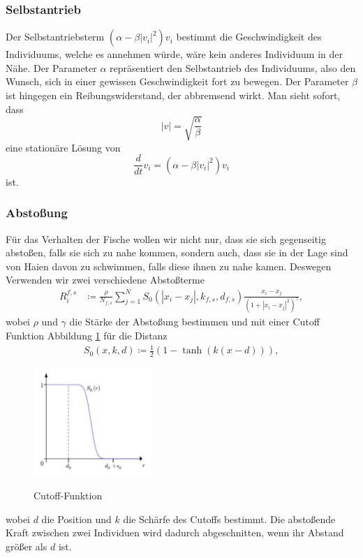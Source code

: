 \documentclass[a4paper,11pt]{article}
\theoremstyle{definition}
\numberwithin{equation}{section}
\begin{document}
	\subsubsection{Selbstantrieb}	
		Der Selbstantriebsterm $(\alpha - \beta |v_i|^2)v_i$ bestimmt die Geschwindigkeit des Individuums, welche es annehmen würde, wäre kein anderes Individuum in der Nähe. Der Parameter $\alpha$ repräsentiert den Selbstantrieb des Individuums, also den Wunsch, sich
in einer gewissen Geschwindigkeit fort zu bewegen. Der Parameter $\beta$ ist hingegen ein Reibungswiderstand, der abbremsend wirkt.
		Man sieht sofort, dass
		\begin{equation}
		|v| = \sqrt{\frac{\alpha}{\beta}}
		\end{equation}
		eine stationäre Lösung von 
	\begin{equation}
		\frac{d}{dt}v_i = (\alpha - \beta |v_i|^2)v_i
		\end{equation}
		ist.
	\subsubsection{Abstoßung}
	Für das Verhalten der Fische wollen wir nicht nur, dass sie sich gegenseitig abstoßen, falls sie sich zu nahe kommen, sondern auch, dass sie in der Lage sind von Haien davon zu schwimmen, falls diese ihnen zu nahe kamen. Deswegen Verwenden wir zwei verschiedene Abstoßterme
	\begin{align*}
		R^{f,s}_i &\coloneqq \frac{\rho}{N_{f,s}}\sum^N_{j=1} S_0(|x_i-x_j|, k_{f,s}, d_{f,s})\frac{x_i-x_j}{\left(1+|x_i-x_j|^2\right)^{\gamma}},
	\end{align*}
	wobei $\rho$ und $\gamma$ die Stärke der Abstoßung bestimmen und mit einer Cutoff Funktion Abbildung \ref{fig:cutoff} für die Distanz
	\begin{align*}
		S_0(x, k, d) \coloneqq \frac{1}{2}(1-\tanh(k(x-d))),
	\end{align*}
	\begin{figure}
	\centering
	\includegraphics[width=0.4\textwidth]{pictures/cutoff.png}
		\label{fig:cutoff}
		\caption{Cutoff-Funktion \cite{agueh2011analysis}}
	\end{figure}
	wobei $d$ die Position und $k$ die Schärfe des Cutoffs bestimmt. 
Die abstoßende Kraft zwischen zwei Individuen wird dadurch abgeschnitten, wenn ihr Abstand größer als $d$ ist.
\end{document}
